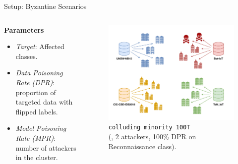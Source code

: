   \begin{frame}{Setup: Byzantine Scenarios}
      \begin{columns}
          \begin{column}{.4\textwidth}
              \textbf{Parameters}
              \begin{itemize}
                  \item \textit{Target}: Affected classes.
                  \item \textit{Data Poisoning Rate (DPR)}: proportion of targeted data with flipped labels.
                  \item \textit{Model Poisoning Rate (MPR)}: number of attackers in the cluster.
              \end{itemize}
          \end{column}
          \begin{column}{.56\textwidth}
            \begin{figure}
              \captionsetup{font=small, labelfont=small}
              \includegraphics[width=\linewidth]{figures/radar/poisoning.pdf}%
              \captionsetup{justification=centering}
              \caption*{
                \texttt{colluding minority 100T}\\
                \smaller (\ie, 2 attackers, 100\% DPR on Reconnaissance class).
              }
            \end{figure}
          \end{column}
      \end{columns}
  \end{frame}

